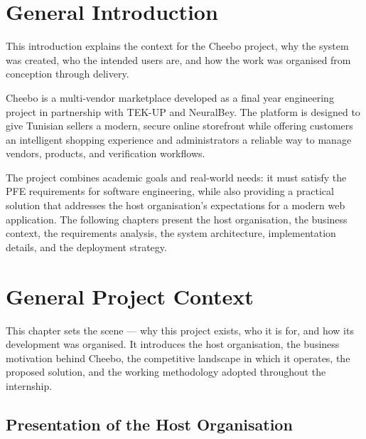 \documentclass[12pt, a4paper, oneside]{report}
\newenvironment{chapterintro}{%
  \begin{mdframed}[backgroundcolor=cheebolightgray,linecolor=cheeboblue,linewidth=1pt]
  \small\itshape
}{%
  \end{mdframed}
}
\begin{document}
\newpage
\chapter*{General Introduction}

This introduction explains the context for the Cheebo project, why the system was created, who the intended users are, and how the work was organised from conception through delivery.

Cheebo is a multi-vendor marketplace developed as a final year engineering project in partnership with TEK-UP and NeuralBey. The platform is designed to give Tunisian sellers a modern, secure online storefront while offering customers an intelligent shopping experience and administrators a reliable way to manage vendors, products, and verification workflows.

The project combines academic goals and real-world needs: it must satisfy the PFE requirements for software engineering, while also providing a practical solution that addresses the host organisation’s expectations for a modern web application. The following chapters present the host organisation, the business context, the requirements analysis, the system architecture, implementation details, and the deployment strategy.

\chapter{General Project Context}

\begin{chapterintro}
  This chapter sets the scene --- why this project exists, who it is for,
  and how its development was organised. It introduces the host organisation,
  the business motivation behind Cheebo, the competitive landscape in which
  it operates, the proposed solution, and the working methodology adopted
  throughout the internship.
\end{chapterintro}

\section{Presentation of the Host Organisation}
\end{document}

